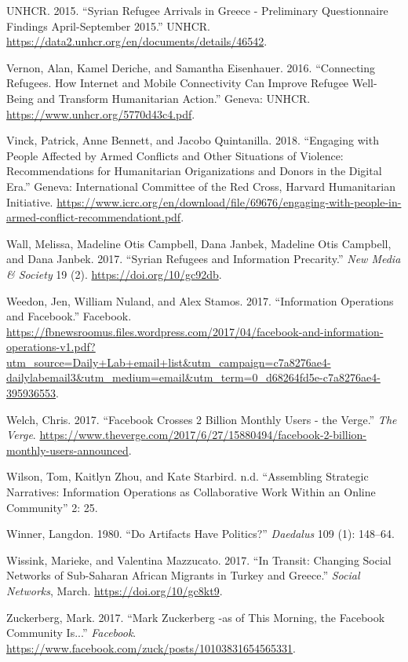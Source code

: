 \documentclass[
]{article}
\newlength{\cslhangindent}
\newenvironment{cslreferences}%
  {\setlength{\parindent}{0pt}%
  \everypar{\setlength{\hangindent}{\cslhangindent}}\ignorespaces}%
  {\par}
\begin{document}
\begin{cslreferences}
\leavevmode\hypertarget{ref-UNHCR2015Syrian}{}%
UNHCR. 2015. ``Syrian Refugee Arrivals in Greece - Preliminary
Questionnaire Findings April-September 2015.'' UNHCR.
\url{https://data2.unhcr.org/en/documents/details/46542}.

\leavevmode\hypertarget{ref-Vernon2016Connecting}{}%
Vernon, Alan, Kamel Deriche, and Samantha Eisenhauer. 2016. ``Connecting
Refugees. How Internet and Mobile Connectivity Can Improve Refugee
Well-Being and Transform Humanitarian Action.'' Geneva: UNHCR.
\url{https://www.unhcr.org/5770d43c4.pdf}.

\leavevmode\hypertarget{ref-Vinck2018Engaging}{}%
Vinck, Patrick, Anne Bennett, and Jacobo Quintanilla. 2018. ``Engaging
with People Affected by Armed Conflicts and Other Situations of
Violence: Recommendations for Humanitarian Origanizations and Donors in
the Digital Era.'' Geneva: International Committee of the Red Cross,
Harvard Humanitarian Initiative.
\url{https://www.icrc.org/en/download/file/69676/engaging-with-people-in-armed-conflict-recommendationt.pdf}.

\leavevmode\hypertarget{ref-Wall2017Syrian}{}%
Wall, Melissa, Madeline Otis Campbell, Dana Janbek, Madeline Otis
Campbell, and Dana Janbek. 2017. ``Syrian Refugees and Information
Precarity.'' \emph{New Media \& Society} 19 (2).
\url{https://doi.org/10/gc92db}.

\leavevmode\hypertarget{ref-Weedon2017Information}{}%
Weedon, Jen, William Nuland, and Alex Stamos. 2017. ``Information
Operations and Facebook.'' Facebook.
\url{https://fbnewsroomus.files.wordpress.com/2017/04/facebook-and-information-operations-v1.pdf?utm_source=Daily+Lab+email+list\&utm_campaign=c7a8276ae4-dailylabemail3\&utm_medium=email\&utm_term=0_d68264fd5e-c7a8276ae4-395936553}.

\leavevmode\hypertarget{ref-WelchChris2017Facebook}{}%
Welch, Chris. 2017. ``Facebook Crosses 2 Billion Monthly Users - the
Verge.'' \emph{The Verge}.
\url{https://www.theverge.com/2017/6/27/15880494/facebook-2-billion-monthly-users-announced}.

\leavevmode\hypertarget{ref-WilsonAssembling}{}%
Wilson, Tom, Kaitlyn Zhou, and Kate Starbird. n.d. ``Assembling
Strategic Narratives: Information Operations as Collaborative Work
Within an Online Community'' 2: 25.

\leavevmode\hypertarget{ref-Winner1980Do}{}%
Winner, Langdon. 1980. ``Do Artifacts Have Politics?'' \emph{Daedalus}
109 (1): 148--64.

\leavevmode\hypertarget{ref-Wissink2017In}{}%
Wissink, Marieke, and Valentina Mazzucato. 2017. ``In Transit: Changing
Social Networks of Sub-Saharan African Migrants in Turkey and Greece.''
\emph{Social Networks}, March. \url{https://doi.org/10/gc8kt9}.

\leavevmode\hypertarget{ref-Zuckerberg2017Mark}{}%
Zuckerberg, Mark. 2017. ``Mark Zuckerberg -as of This Morning, the
Facebook Community Is...'' \emph{Facebook}.
\url{https://www.facebook.com/zuck/posts/10103831654565331}.
\end{cslreferences}
\end{document}
